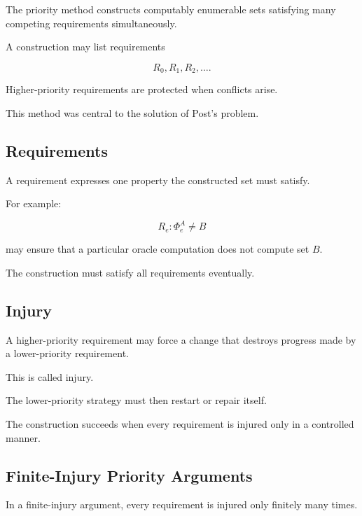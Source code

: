 The priority method constructs computably enumerable sets satisfying many
competing requirements simultaneously.

A construction may list requirements

\[
\boxed{
R_0,
R_1,
R_2,\ldots.
}
\]

Higher-priority requirements are protected when conflicts arise.

This method was central to the solution of Post's problem.

\subsection{Requirements}
\label{subsec:priority-requirements}

A requirement expresses one property the constructed set must satisfy.

For example:

\[
\boxed{
R_e:
\Phi_e^A
\neq
B
}
\]

may ensure that a particular oracle computation does not compute set \(B\).

The construction must satisfy all requirements eventually.

\subsection{Injury}
\label{subsec:priority-injury}

A higher-priority requirement may force a change that destroys progress
made by a lower-priority requirement.

This is called injury.

The lower-priority strategy must then restart or repair itself.

The construction succeeds when every requirement is injured only in a
controlled manner.

\subsection{Finite-Injury Priority Arguments}
\label{subsec:finite-injury}

In a finite-injury argument, every requirement is injured only finitely
many times.

